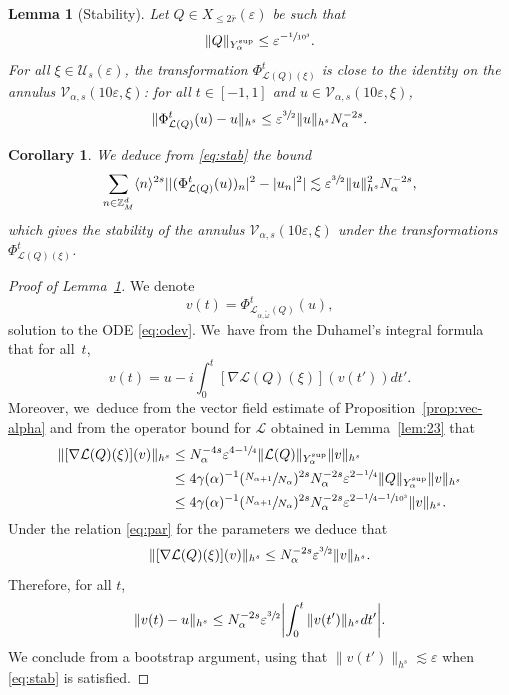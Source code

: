 \documentclass[JEP,XML,SOM,Unicode,published]{cedram}
\theoremstyle{plain}
\newtheorem{corollary}[theorem]{Corollary}
\newtheorem{lemma}[theorem]{Lemma}
\theoremstyle{definition}
\newcommand{\Z}{\mathbb{Z}}
\newcommand{\1}{\mathbf{1}}
\newcommand{\Ysup}[1]{Y_{#1}^{\mathrm{sup}}}
\let\epsilon\varepsilon
\begin{document}
\begin{lemma}[Stability]\label{lem:stab} Let $Q\in X_{\leq2\overline{r}}(\epsilon)$ be such that
\begin{equation}
\label{eq:ass-Q}
\|Q\|_{\Ysup{\alpha}}
\leq \epsilon^{-\sfrac{1}{10^{3}}}.
\end{equation}
For all $\xi\in\mathcal{U}_{s}(\epsilon)$, the transformation $\Phi_{\mathcal{L}(Q)(\xi)}^{t}$ is close to the identity on the annulus $\mathcal{V}_{\alpha,s}(10\epsilon,\xi)$: for all $t\in[-1,1]$ and $u\in\mathcal{V}_{\alpha,s}(10\epsilon,\xi)$,
\begin{equation}
\label{eq:stab}
\|\Phi_{\mathcal{L}(Q)}^{t}(u)-u\|_{h^{s}}
\leq\epsilon^{\sfrac{3}{2}}\|u\|_{h^{s}}N_{\alpha}^{-2s}.
\end{equation}
\end{lemma}
\begin{corollary}
We deduce from \eqref{eq:stab} the bound
\begin{equation}
\label{eq:stab-a}
\sum_{n\in\Z_{M}^{d}}\langle n\rangle^{2s}||(\Phi_{\mathcal{L}(Q)}^{t}(u))_{n}|^{2}-|u_{n}|^{2}|
\lesssim \epsilon^{\sfrac{3}{2}}\|u\|_{h^{s}}^{2}N_{\alpha}^{-2s},
\end{equation}
which gives the stability of the annulus $\mathcal{V}_{\alpha,s}(10\epsilon,\xi)$ under the transformations $\Phi_{\mathcal{L}(Q)(\xi)}^{t}$.
\end{corollary}

\begin{proof}[Proof of Lemma~\ref{lem:stab}] We denote
\[
v(t) = \Phi_{\mathcal{L}_{\alpha,\widetilde{\omega}}(Q)}^t(u),
\]
solution to the ODE \eqref{eq:odev}. We~have from the Duhamel's integral formula that for all~$t$,
\[
v(t) = u - i\int_{0}^{t}[\nabla\mathcal{L}(Q)(\xi)](v(t'))dt'.
\]
Moreover, we~deduce from the vector field estimate of Proposition~\ref{prop:vec-alpha} and from the operator bound for $\mathcal{L}$ obtained in Lemma~\ref{lem:23} that
\begin{align*}
\|[\nabla \mathcal{L}(Q)(\xi)](v)\|_{h^{s}}
&\leq
N_{\alpha}^{-4s}\epsilon^{4-\sfrac{1}{4}}
\|
\mathcal{L}(Q)
\|_{\Ysup{\alpha}}
\|
v
\|_{h^{s}} \\
&\leq
4\gamma(\alpha)^{-1}(\sfrac{N_{\alpha+1}}{N_{\alpha}})^{2s}N_{\alpha}^{-2s}\epsilon^{2-\sfrac{1}{4}}
\|
Q
\|_{\Ysup{\alpha}}
\|v
\|_{h^{s}} \\
&\leq
4\gamma(\alpha)^{-1}(\sfrac{N_{\alpha+1}}{N_{\alpha}})^{2s}N_{\alpha}^{-2s}\epsilon^{2-\sfrac{1}{4}-\sfrac{1}{10^{3}}}
\|v
\|_{h^{s}} .
\end{align*}
Under the relation \eqref{eq:par} for the parameters we deduce that
\[
\|[\nabla \mathcal{L}(Q)(\xi)](v)\|_{h^{s}}
\leq N_{\alpha}^{-2s}\epsilon^{\sfrac{3}{2}}\|v\|_{h^{s}}.
\]
Therefore, for all $t$,
\[
\|v(t)-u\|_{h^{s}} \leq N_{\alpha}^{-2s}\epsilon^{\sfrac{3}{2}} \biggl|\int_{0}^{t}\|v(t')\|_{h^{s}}dt'\biggr|.
\]
We conclude from a bootstrap argument, using that $\|v(t')\|_{h^{s}}\lesssim\epsilon$ when \eqref{eq:stab} is satisfied.
\end{proof}
\end{document}
